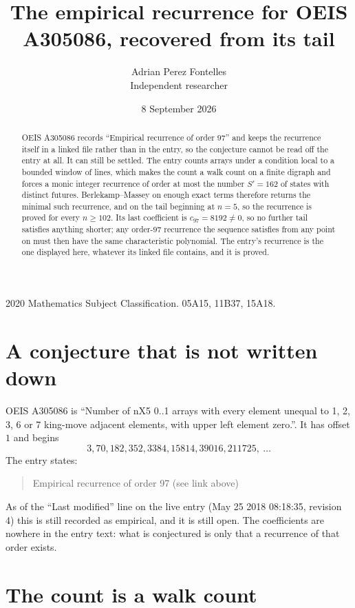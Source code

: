 \documentclass[11pt,a4paper]{article}
\title{The empirical recurrence for OEIS A305086, recovered from its tail}
\author{Adrian Perez Fontelles\\ \small Independent researcher}
\date{8 September 2026}
\theoremstyle{plain}
\theoremstyle{definition}
\begin{document}
\maketitle

\begin{abstract}
OEIS A305086 records ``Empirical recurrence of order $97$'' and keeps the recurrence itself in
a linked file rather than in the entry, so the conjecture cannot be read off the entry at all.
It can still be settled. The entry counts arrays under a condition local to a bounded window of
lines, which makes the count a walk count on a finite digraph and forces a monic integer
recurrence of order at most the number $S'=162$ of states with distinct futures. Berlekamp--Massey on
enough exact terms therefore returns the minimal such recurrence, and on the tail beginning at $n=5$, so the recurrence is proved for every $n\ge102$.
Its last coefficient is $c_{97}=8192\neq0$, so no further tail satisfies anything
shorter; any order-$97$ recurrence the sequence satisfies from any point on must then have
the same characteristic polynomial. The entry's recurrence is the one displayed here, whatever
its linked file contains, and it is proved.
\end{abstract}

\noindent\small 2020 Mathematics Subject Classification. 05A15, 11B37, 15A18.\normalsize

\section{A conjecture that is not written down}

OEIS A305086 is ``Number of nX5 0..1 arrays with every element unequal to 1, 2, 3, 6 or 7 king-move adjacent elements, with upper left element zero.''. It has offset $1$ and begins
\[
3, 70, 182, 352, 3384, 15814, 39016, 211725,\ \dots
\]
The entry states:
\begin{quote}
Empirical recurrence of order 97 (see link above)
\end{quote}
As of the ``Last modified'' line on the live entry (May 25 2018 08:18:35, revision 4)
this is still recorded as empirical, and it is still open. The coefficients are nowhere in the
entry text: what is conjectured is only that a recurrence of that order exists.

\section{The count is a walk count}
\end{document}
